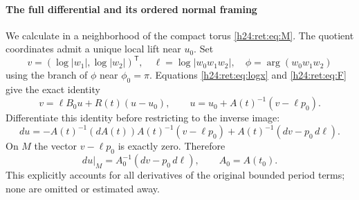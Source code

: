 \paragraph{The full differential and its ordered normal framing}

We calculate in a neighborhood of the compact torus \eqref{h24:ret:eq:M}.
The quotient coordinates admit a unique local lift near \(u_0\).
Set
\[
 v=(\log|w_1|,\log|w_2|)^{\mathsf T},\quad
 \ell=\log|w_0w_1w_2|,\quad
 \phi=\arg(w_0w_1w_2)
\]
using the branch of \(\phi\) near \(\phi_0=\pi\).
Equations \eqref{h24:ret:eq:logx} and \eqref{h24:ret:eq:F} give the exact identity
\begin{equation}
 v=\ell B_0u+R(t)(u-u_0),\qquad
 u=u_0+A(t)^{-1}(v-\ell p_0).
 \label{h24:ret:eq:exact-u}
\end{equation}
Differentiate this identity before restricting to the inverse image:
\begin{equation}
 du=-A(t)^{-1}(dA(t))A(t)^{-1}(v-\ell p_0)
        +A(t)^{-1}(dv-p_0\,d\ell).
 \label{h24:ret:eq:full-derivative}
\end{equation}
On \(M\) the vector \(v-\ell p_0\) is exactly zero.  Therefore
\begin{equation}
 du|_M=A_0^{-1}(dv-p_0\,d\ell),\qquad A_0=A(t_0).
 \label{h24:ret:eq:derivative-on-M}
\end{equation}
This explicitly accounts for all derivatives of the original bounded
period terms; none are omitted or estimated away.

